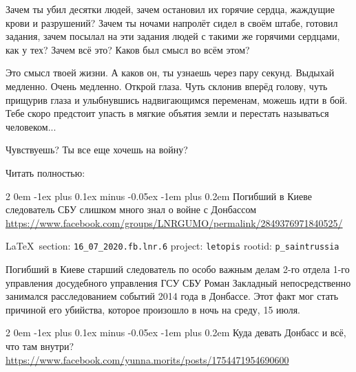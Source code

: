 \documentclass[a4paper,11pt]{extreport}
\makeatletter
\renewcommand\subsection{%
  \clearpage
    \@startsection{subsection}%
    {2}%
    {0em}%
    {-1ex plus 0.1ex minus -0.05ex}%
    {-1em plus 0.2em}%
    {\scshape\bfseries\Large}%
}
\makeatother
\begin{document}
Зачем ты убил десятки людей, зачем остановил их горячие сердца, жаждущие крови
и разрушений? Зачем ты ночами напролёт сидел в своём штабе, готовил задания,
зачем посылал на эти задания людей с такими же горячими сердцами, как у тех?
Зачем всё это? Каков был смысл во всём этом?

Это смысл твоей жизни. А каков он, ты узнаешь через пару секунд. Выдыхай
медленно. Очень медленно. Открой глаза. Чуть склонив вперёд голову, чуть
прищурив глаза и улыбнувшись надвигающимся переменам, можешь идти в бой. Тебе
скоро предстоит упасть в мягкие объятия земли и перестать называться
человеком...

Чувствуешь? Ты все еще хочешь на войну?

Читать полностью: 
 
 

\subsection{Погибший в Киеве следователь СБУ слишком много знал о войне с Донбассом}
\label{sec:16_07_2020.fb.lnr.6}
\url{https://www.facebook.com/groups/LNRGUMO/permalink/2849376971840525/}
  
\vspace{0.5cm}
{\ifDEBUG\small\LaTeX~section: \verb|16_07_2020.fb.lnr.6| project: \verb|letopis| rootid: \verb|p_saintrussia|\fi}
\vspace{0.5cm}

Погибший в Киеве старший следователь по особо важным делам 2-го отдела 1-го
управления досудебного управления ГСУ СБУ Роман Закладный непосредственно
занимался расследованием событий 2014 года в Донбассе. Этот факт мог стать
причиной его убийства, которое произошло в ночь на среду, 15 июля. 

 
 
\subsection{Куда девать Донбасс и всё, что там внутри?}
\label{sec:16_07_2020.fb.yunna.morits.donbass}
\url{https://www.facebook.com/yunna.morits/posts/1754471954690600}
  
\end{document}
